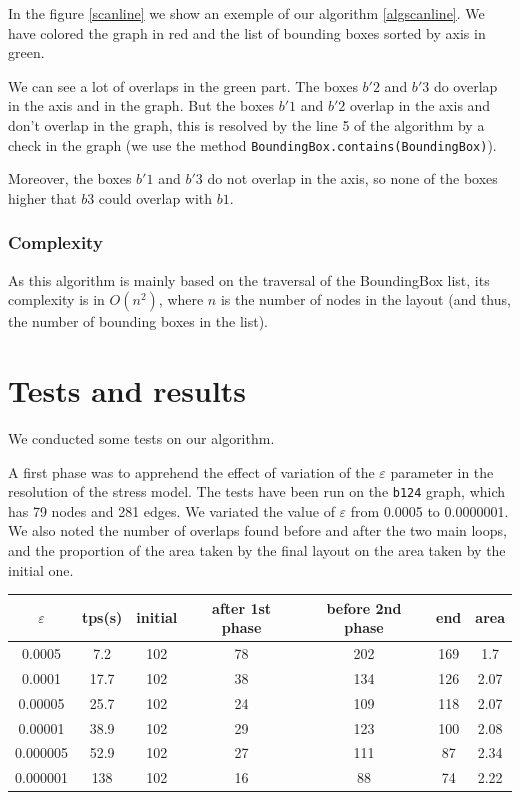\documentclass[12pt]{report}
\begin{document}
In the figure \ref{scanline} we show an exemple of our algorithm \ref{algscanline}. We have colored the graph in red and the list of bounding boxes sorted by axis in green. 

We can see a lot of overlaps in the green part. The boxes $b'2$ and $b'3$ do overlap in the axis and in the graph. But the boxes $b'1$ and $b'2$ overlap in the axis and don't overlap in the graph, this is resolved by the line 5 of the algorithm by a check in the graph (we use the method \texttt{BoundingBox.contains(BoundingBox)}).

Moreover, the boxes $b'1$ and $b'3$ do not overlap in the axis, so none of the boxes higher that $b3$ could overlap with $b1$.

\subsubsection{Complexity}

As this algorithm is mainly based on the traversal of the BoundingBox list, its complexity is in $O(n^2)$, where $n$ is the number of nodes in the layout (and thus, the number of bounding boxes in the list). 

\section{Tests and results}
We conducted some tests on our algorithm. 

A first phase was to apprehend the effect of variation of the $\varepsilon$ parameter in the resolution of the stress model.
The tests have been run on the \texttt{b124} graph, which has 79 nodes and 281 edges. We variated the value of $\varepsilon$ from 0.0005 to 0.0000001. We also noted the number of overlaps found before and after the two main loops, and the proportion of the area taken by the final layout on the area taken by the initial one.

\begin{center}
\begin{tabular}{|c|c|c|c|c|c|c|}
	\hline 
	 $\varepsilon$ & tps(s) & initial & after 1st phase & before 2nd phase & end & area \\
	\hline
	0.0005 & 7.2 & 102 & 78 & 202 & 169 & 1.7\\
	0.0001 & 17.7 & 102 & 38  & 134 & 126 & 2.07\\
	0.00005 & 25.7 & 102 & 24 & 109 & 118 & 2.07\\
	0.00001 & 38.9 & 102 & 29 & 123 & 100 & 2.08\\
	0.000005 & 52.9 & 102 & 27 & 111 & 87 & 2.34\\
	0.000001 & 138 & 102 & 16 & 88 & 74 & 2.22\\
	\hline
\end{tabular}
\end{center}
\end{document}
